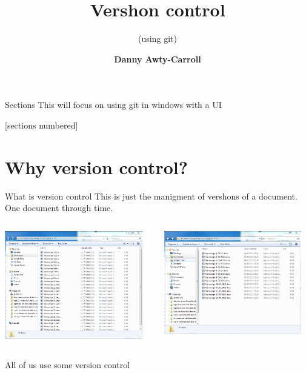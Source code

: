 \documentclass[10pt]{beamer}
\title{Vershon control}
\subtitle{(using git)}
\author{\textbf{Danny Awty-Carroll}}
\institute{\tiny{\date{\today}}}
\begin{document}
\maketitle



\begin{frame}{Sections}
This will focus on using git in windows with a UI
\newline

  [sections numbered]
  \tableofcontents[hideallsubsections]
\end{frame}




\section{Why version control?}


\begin{frame}[fragile]{What is version control}
This is just the manigment of vershons of a document.\\
One document through time.
  \begin{columns}[T]
    \begin{column}{.5\textwidth}
	\includegraphics[width=6cm]{Figs/old/no}
    \end{column}
    \begin{column}{.5\textwidth}
	\includegraphics[width=6cm]{Figs/old/date}
    \end{column}
  \end{columns}
All of us use some version control
\end{frame}
\end{document}
